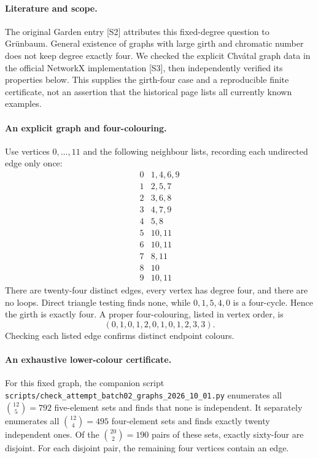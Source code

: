 \documentclass[11pt,a4paper]{article}
\begin{document}
\paragraph{Literature and scope.}
The original Garden entry [S2] attributes this fixed-degree question to Gr\"unbaum. General existence of graphs with large girth and chromatic number does not keep degree exactly four. We checked the explicit Chv\'atal graph data in the official NetworkX implementation [S3], then independently verified its properties below. This supplies the girth-four case and a reproducible finite certificate, not an assertion that the historical page lists all currently known examples.

\paragraph{An explicit graph and four-colouring.}
Use vertices $0,\ldots,11$ and the following neighbour lists, recording each undirected edge only once:
\[
\begin{array}{c|l}
0&1,4,6,9\\1&2,5,7\\2&3,6,8\\3&4,7,9\\
4&5,8\\5&10,11\\6&10,11\\7&8,11\\8&10\\9&10,11
\end{array}
\]
There are twenty-four distinct edges, every vertex has degree four, and there are no loops. Direct triangle testing finds none, while $0,1,5,4,0$ is a four-cycle. Hence the girth is exactly four. A proper four-colouring, listed in vertex order, is
\[
 (0,1,0,1,2,0,1,0,1,2,3,3).
\]
Checking each listed edge confirms distinct endpoint colours.

\paragraph{An exhaustive lower-colour certificate.}
For this fixed graph, the companion script \texttt{scripts/check\_attempt\_batch02\_graphs\_2026\_10\_01.py} enumerates all $\binom{12}{5}=792$ five-element sets and finds that none is independent. It separately enumerates all $\binom{12}{4}=495$ four-element sets and finds exactly twenty independent ones. Of the $\binom{20}{2}=190$ pairs of these sets, exactly sixty-four are disjoint. For each disjoint pair, the remaining four vertices contain an edge.
\end{document}
